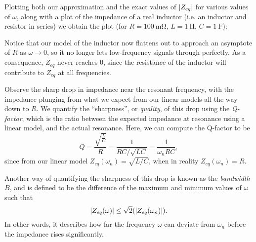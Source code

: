 \documentclass[letterpaper]{article}
\theoremstyle{remark}
\DeclarePairedDelimiter\abs{\lvert}{\rvert}%
\begin{document}
Plotting both our approximation and the exact values of $\abs{Z_{eq}}$ for various values of $\omega$, along with a plot of the impedance of a real inductor (i.e. an inductor and resistor in series) we obtain the plot (for $R = \SI{100}{\milli\ohm}$, $L = \SI{1}{\henry}$, $C=\SI{1}{\farad}$):
\begin{center}
\end{center}
Notice that our model of the inductor now flattens out to approach an asymptote of $R$ as $\omega \to 0$, so it no longer lets low-frequency signals through perfectly. As a consequence, $Z_{eq}$ never reaches $0$, since the resistance of the inductor will contribute to $Z_{eq}$ at all frequencies.

Observe the sharp drop in impedance near the resonant frequency, with the impedance plunging from what we expect from our linear models all the way down to $R$. We quantify the ``sharpness'', or \emph{quality}, of this drop using the \emph{Q-factor}, which is the ratio between the expected impedance at resonance using a linear model, and the actual resonance. Here, we can compute the Q-factor to be
\[
    Q = \frac{\sqrt{\frac{L}{C}}}{R} = \frac{1}{R C / \sqrt{LC}} = \frac{1}{\omega_nRC},
\]
since from our linear model $Z_{eq}(\omega_n) = \sqrt{L / C}$, when in reality $Z_{eq}(\omega_n) = R$.

Another way of quantifying the sharpness of this drop is known as the \emph{bandwidth} $B$, and is defined to be the difference of the maximum and minimum values of $\omega$ such that
\[
    \abs{Z_{eq}(\omega)} \le \sqrt{2} (\abs{Z_{eq}(\omega_n)}).
\]
In other words, it describes how far the frequency $\omega$ can deviate from $\omega_n$ before the impedance rises significantly. 
\end{document}
